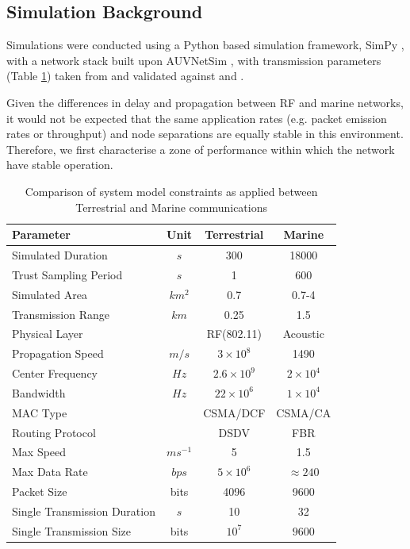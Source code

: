 \documentclass[conference]{IEEEtran}
\begin{document}
\subsection{Simulation Background}

Simulations were conducted using a Python based simulation framework, SimPy \cite{Mueller2003SimPy}, with a network stack built upon AUVNetSim \cite{Miquel2008}, with transmission parameters (Table \ref{tab:sysconstraints}) taken from and validated against \cite{Stojanovic2007} and \cite{Stefanov2011}.

Given the differences in delay and propagation between RF and marine networks, it would not be expected that the same application rates (e.g. packet emission rates or throughput) and node separations are equally stable in this environment.
Therefore, we first characterise a zone of performance within which the network have stable operation.
%
\begin{table}[h]
  \caption{Comparison of system model constraints as applied between Terrestrial and Marine communications} \label{tab:sysconstraints}
  \begin{center}
    \setlength{\tabcolsep}{8pt}
    \begin{tabular}{lccc}
      \toprule
      Parameter & Unit & Terrestrial & Marine \\
      \midrule
      Simulated Duration & $s$ & 300 & 18000\\
      Trust Sampling Period & $s$ & 1 & 600 \\
      Simulated Area & $km^2$ & 0.7 & 0.7-4 \\
      Transmission Range & $km$ & 0.25 & 1.5 \\
      Physical Layer & & RF(802.11) & Acoustic\\
      Propagation Speed& $m/s$ & $3\times10^8$ & 1490\\
      Center Frequency& $Hz$ & $2.6\times10^9$ & $2 \times 10^4$ \\
      Bandwidth& $Hz$ & $22\times10^6$ & $1\times10^4$\\
      MAC Type & & CSMA/DCF & CSMA/CA\\
      Routing Protocol & & DSDV & FBR \\
      Max Speed & $ms^{-1}$ & 5 & 1.5 \\
      Max Data Rate & $bps$ & $5\times10^6$ & $\approx 240$ \\
      Packet Size & bits & 4096 &  9600 \\
      Single Transmission Duration & $s$ & 10 & 32 \\
      Single Transmission Size & bits & $10^7$ & $9600$ \\
      \bottomrule
    \end{tabular}
    \setlength{\tabcolsep}{6pt}
  \end{center}
\end{table}
%
\end{document}
